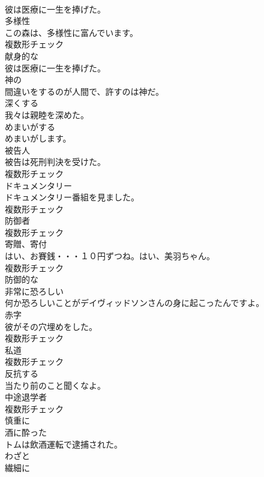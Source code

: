 \documentclass[8pt]{extreport}
\begin{document}
\begin{CJK}{UTF8}{min}
\\	彼は医療に一生を捧げた。	
\\	[名詞]	多様性	
\\	この森は、多様性に富んでいます。	
\\	複数形チェック
\\	[形容詞]	献身的な	
\\	彼は医療に一生を捧げた。	
\\	[形容詞]	神の	
\\	間違いをするのが人間で、許すのは神だ。	
\\	[動詞]	深くする	
\\	我々は親睦を深めた。	
\\	[形容詞]	めまいがする	
\\	めまいがします。	
\\	[名詞]	被告人	
\\	被告は死刑判決を受けた。	
\\	複数形チェック
\\	[名詞]	ドキュメンタリー	
\\	ドキュメンタリー番組を見ました。	
\\	複数形チェック
\\	[名詞]	防御者	
\\	複数形チェック
\\	[名詞]	寄贈、寄付	
\\	はい、お賽銭・・・１０円ずつね。はい、美羽ちゃん。	
\\	複数形チェック
\\	[形容詞]	防御的な	
\\	[形容詞]	非常に恐ろしい	
\\	何か恐ろしいことがデイヴィッドソンさんの身に起こったんですよ。	
\\	[名詞]	赤字	
\\	彼がその穴埋めをした。	
\\	複数形チェック
\\	[名詞]	私道	
\\	複数形チェック
\\	[動詞]	反抗する	
\\	当たり前のこと聞くなよ。	
\\	[名詞]	中途退学者	
\\	複数形チェック
\\	[形容詞]	慎重に	
\\	[形容詞]	酒に酔った	
\\	トムは飲酒運転で逮捕された。	
\\	[副詞]	わざと	
\\	[形容詞]	繊細に	

\end{CJK}
\end{document}
